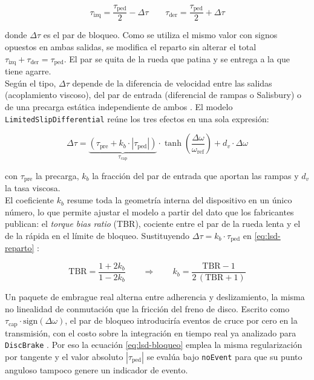 \begin{equation}
	\tau_\text{izq} = \frac{\tau_\text{ped}}{2} - \Delta\tau
	\qquad
	\tau_\text{der} = \frac{\tau_\text{ped}}{2} + \Delta\tau
	\label{eq:lsd-reparto}
\end{equation} 

donde $\Delta\tau$ es el par de bloqueo. Como se utiliza el mismo valor con signos opuestos en ambas salidas, se modifica el reparto sin alterar el total $\tau_\text{izq} + \tau_\text{der} = \tau_\text{ped}$. El par se quita de la rueda que patina y se entrega a la que tiene agarre. \\

Según el tipo,  $\Delta\tau$ depende de la diferencia de velocidad entre las salidas (acoplamiento viscoso), del par de entrada (diferencial de rampas o Salisbury) o de una precarga estática independiente de ambos \cite{gadola2021}. El modelo \verb|LimitedSlipDifferential| reúne los tres efectos en una sola expresión:

\begin{equation}
	\Delta\tau = \underbrace{\left(\tau_\text{pre} + k_b \cdot |\tau_\text{ped}|\right)}_{\tau_\text{cap}} \cdot \tanh\!\left(\frac{\Delta\omega}{\omega_\text{ref}}\right) + d_v \cdot \Delta\omega
	\label{eq:lsd-bloqueo}
\end{equation}

con $\tau_\text{pre}$ la precarga, $k_b$ la fracción del par de entrada que aportan las rampas y $d_v$ la tasa viscosa.\\

El coeficiente $k_b$ resume toda la geometría interna del dispositivo en un único número, lo que permite ajustar el modelo a partir del dato que los fabricantes publican: el \textit{torque bias ratio} (TBR), cociente entre el par de la rueda lenta y el de la rápida en el límite de bloqueo. Sustituyendo $\Delta\tau = k_b \cdot \tau_\text{ped}$ en \eqref{eq:lsd-reparto} \cite{gadola2021}:

\begin{equation}
	\text{TBR} = \frac{1 + 2k_b}{1 - 2k_b}
	\qquad\Longrightarrow\qquad
	k_b = \frac{\text{TBR} - 1}{2\,(\text{TBR} + 1)}
	\label{eq:tbr}
\end{equation}

Un paquete de embrague real alterna entre adherencia y deslizamiento, la misma no linealidad de conmutación que la fricción del freno de disco.  Escrito como $\tau_\text{cap} \cdot \text{sign}(\Delta\omega)$, el par de bloqueo introduciría eventos de cruce por cero en la transmisión, con el costo sobre la integración en tiempo real ya analizado para \verb|DiscBrake| \cite{armstrong1994}. Por eso la ecuación \eqref{eq:lsd-bloqueo} emplea la misma regularización por tangente y el valor absoluto $|\tau_\text{ped}|$ se evalúa bajo \verb|noEvent| para que su punto anguloso tampoco genere un indicador de evento.\\

